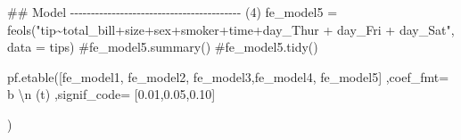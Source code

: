 \documentclass[
  letterpaper,
  DIV=11,
  numbers=noendperiod]{scrreprt}
\newenvironment{Shaded}{\begin{snugshade}}{\end{snugshade}}
\newcommand{\CharTok}[1]{\textcolor[rgb]{0.13,0.47,0.30}{#1}}
\newcommand{\CommentTok}[1]{\textcolor[rgb]{0.37,0.37,0.37}{#1}}
\newcommand{\FloatTok}[1]{\textcolor[rgb]{0.68,0.00,0.00}{#1}}
\newcommand{\NormalTok}[1]{\textcolor[rgb]{0.00,0.23,0.31}{#1}}
\newcommand{\OperatorTok}[1]{\textcolor[rgb]{0.37,0.37,0.37}{#1}}
\newcommand{\StringTok}[1]{\textcolor[rgb]{0.13,0.47,0.30}{#1}}
\begin{document}
\begin{Shaded}
\begin{Highlighting}[]
\CommentTok{\#\# Model {-}{-}{-}{-}{-}{-}{-}{-}{-}{-}{-}{-}{-}{-}{-}{-}{-}{-}{-}{-}{-}{-}{-}{-}{-}{-}{-}{-}{-}{-}{-}{-}{-}{-}{-}{-}{-}{-}{-}{-}{-} (4)}
\NormalTok{fe\_model5 }\OperatorTok{=}\NormalTok{ feols(}\StringTok{"tip\textasciitilde{}total\_bill+size+sex+smoker+time+day\_Thur + day\_Fri + day\_Sat"}\NormalTok{, data }\OperatorTok{=}\NormalTok{ tips)}
\CommentTok{\#fe\_model5.summary()}
\CommentTok{\#fe\_model5.tidy()}
\end{Highlighting}
\end{Shaded}

\begin{Shaded}
\begin{Highlighting}[]
\NormalTok{pf.etable([fe\_model1, fe\_model2, fe\_model3,fe\_model4, fe\_model5]}
\NormalTok{          ,coef\_fmt}\OperatorTok{=} \StringTok{\textquotesingle{}b }\CharTok{\textbackslash{}n}\StringTok{ (t)\textquotesingle{}}
\NormalTok{          ,signif\_code}\OperatorTok{=}\NormalTok{ [}\FloatTok{0.01}\NormalTok{,}\FloatTok{0.05}\NormalTok{,}\FloatTok{0.10}\NormalTok{]}

\NormalTok{        )}
\end{Highlighting}
\end{Shaded}
\end{document}
